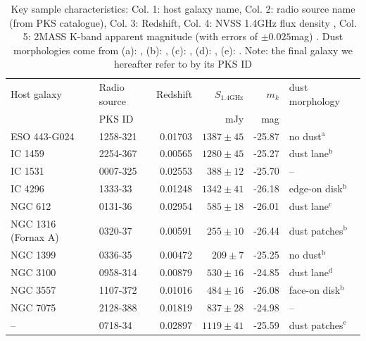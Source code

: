	\begin{table}
		\centering
		\caption{Key sample characteristics: Col. 1: host galaxy name, Col. 2: radio source name (from PKS catalogue), Col. 3: Redshift, Col. 4: NVSS 1.4GHz flux density \citep{Condon1998}, Col. 5: 2MASS K-band apparent magnitude (with errors of $\pm 0.025$mag) \citep{Skrutskie2006}. Dust morphologies come from (a): \citet{Govoni2000}, (b): \citet{Lauer2005}, (c): \citet{Bettoni2001}, (d): \citet{Sandage1979}, (e): \citet{Colbert2001}. Note: the final galaxy we hereafter refer to by its PKS ID}
		\label{tab:sample}
		\begin{tabular}{l l r r r l}
			\hline
			\hline
			Host galaxy	& Radio source 	& Redshift	& $S_\text{1.4GHz}$	& $m_k$ & dust morphology\\
						& PKS ID 		& 			& mJy 				& mag  	&\\
			\hline 
			ESO 443-G024 & 1258-321 	& 0.01703	& $1387 \pm 45$		& -25.87 & no dust$^\text{a}$	\\ 
			IC 1459 	& 2254-367 		& 0.00565 	& $1280 \pm 45$		& -25.27 & dust lane$^\text{b}$	\\
			IC 1531 	& 0007-325 		& 0.02553 	& $388 \pm 12$		& -25.70 & --					\\
			IC 4296		& 1333-33 		& 0.01248 	& $1342 \pm 41$		& -26.18 & edge-on disk$^\text{b}$ \\
			NGC 612 	& 0131-36 		& 0.02954 	& $585 \pm 18$		& -26.01 & dust lane$^\text{c}$	\\
			NGC 1316 (Fornax A) & 0320-37 & 0.00591 & $255 \pm 10$		& -26.44 & dust patches$^\text{b}$ \\
			NGC 1399 	& 0336-35 		& 0.00472 	& $209 \pm 7$		& -25.25 & no dust$^\text{b}$	\\
			NGC 3100 	& 0958-314 		& 0.00879 	& $530 \pm 16$		& -24.85 & dust lane$^\text{d}$	\\
			NGC 3557 	& 1107-372 		& 0.01016 	& $484 \pm 16$		& -26.08 & face-on disk$^\text{b}$\\
			NGC 7075 	& 2128-388 		& 0.01819 	& $837 \pm 28$		& -24.98 & --					\\
			--			& 0718-34 		& 0.02897 	& $1119 \pm 41$		& -25.59 & dust patches$^\text{e}$\\
			\hline
			\hline
		\end{tabular}
	\end{table}



